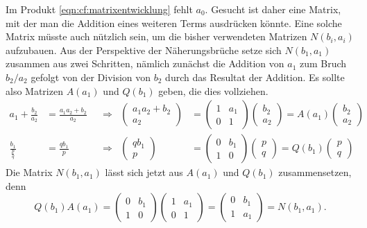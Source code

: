 Im Produkt \eqref{eqn:cf:matrixentwicklung} fehlt $a_0$.
Gesucht ist daher eine Matrix, mit der man die Addition eines weiteren
Terms ausdrücken könnte.
Eine solche Matrix müsste auch nützlich sein, um die bisher verwendeten
Matrizen $N(b_i,a_i)$ aufzubauen.
Aus der Perspektive der Näherungsbrüche setze sich $N(b_1,a_1)$ 
zusammen aus zwei Schritten, nämlich zunächst die Addition von $a_1$
zum Bruch $b_2/a_2$ gefolgt von der Division von $b_2$ durch das Resultat
der Addition.
Es sollte also Matrizen $A(a_1)$ und $Q(b_1)$ geben, die dies vollziehen.
\begin{align*}
a_1+\frac{b_2}{a_2}
&=
\frac{a_1a_2+b_2}{a_2}
&&\Rightarrow
&
\begin{pmatrix}
a_1a_2+b_2\\
a_2
\end{pmatrix}
&=
\begin{pmatrix}
1&a_1\\
0&1
\end{pmatrix}
\begin{pmatrix}
b_2\\
a_2
\end{pmatrix}
=
A(a_1)
\begin{pmatrix}
b_2\\
a_2
\end{pmatrix}
\\
\frac{b_1}{\frac{p}{q}}
&=
\frac{qb_1}{p}
&&\Rightarrow
&
\begin{pmatrix}
qb_1\\
p
\end{pmatrix}
&=
\begin{pmatrix}
0&b_1\\
1&0
\end{pmatrix}
\begin{pmatrix}
p\\
q
\end{pmatrix}
=
Q(b_1)
\begin{pmatrix}
p\\
q
\end{pmatrix}
\end{align*}
Die Matrix $N(b_1,a_1)$ lässt sich jetzt aus $A(a_1)$ und $Q(b_1)$ 
zusammensetzen, denn
\begin{equation}
Q(b_1)
A(a_1)
=
\begin{pmatrix}
0&b_1\\
1&0
\end{pmatrix}
\begin{pmatrix}
1&a_1\\
0&1
\end{pmatrix}
=
\begin{pmatrix}
0&b_1\\
1&a_1
\end{pmatrix}
=
N(b_1,a_1).
\label{eqn:cf:faktorisierung}
\end{equation}

